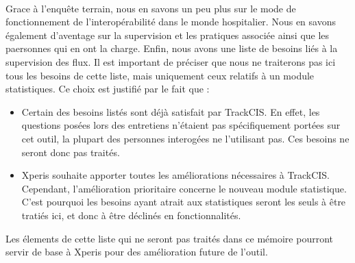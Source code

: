 			\paragraph{}%
			Grace à l'enquête terrain, nous en savons un peu plus sur le mode de
			fonctionnement de l'interopérabilité dans le monde hospitalier. Nous en
			savons également d'aventage sur la supervision et les pratiques associée
			ainsi que les paersonnes qui en ont la charge. Enfin, nous avons une liste de
			besoins liés à la supervision des flux. Il est important de préciser que
			nous ne traiterons pas ici tous les besoins de cette liste, mais uniquement
			ceux relatifs à un module statistiques.
			Ce choix est justifié par le fait que :
			\begin{itemize}
			  \item Certain des besoins listés sont déjà satisfait par TrackCIS. En
			  effet, les questions posées lors des entretiens n'étaient pas
			  spécifiquement portées sur cet outil, la plupart des personnes interogées
			  ne l'utilisant pas. Ces besoins ne seront donc pas traités.
			  \item Xperis souhaite apporter toutes les améliorations nécessaires à
			  TrackCIS. Cependant, l'amélioration prioritaire concerne le nouveau module
			  statistique. C'est pourquoi les besoins ayant atrait aux statistiques
			  seront les seuls à être tratiés ici, et donc à être déclinés en
			  fonctionnalités.
			\end{itemize}
			Les élements de cette liste qui ne seront pas traités dans ce mémoire
			pourront servir de base à Xperis pour des amélioration future de l'outil.
			
